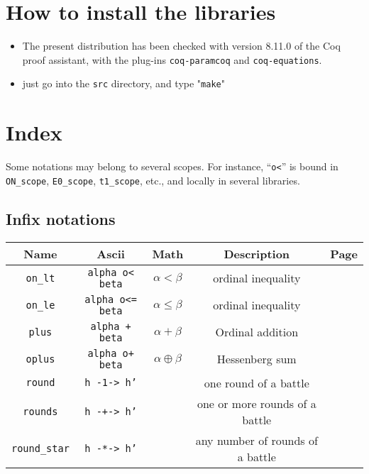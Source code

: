 \documentclass[a4paper]{book}
\begin{document}
\section{How to install the libraries}
\label{sec:orgheadline4}
\begin{itemize}
\item The present distribution has been checked with version 8.11.0 of the Coq proof assistant, with the plug-ins \texttt{coq-paramcoq} and \texttt{coq-equations}.

\item just go into the \texttt{src} directory, and type "\texttt{make}"
\end{itemize}


\section{Index}
Some notations may belong to several scopes. For instance, ``\texttt{o<}'' is
bound in \texttt{ON\_scope}, \texttt{E0\_scope}, \texttt{t1\_scope}, etc., and locally in several libraries.


\subsection{Infix notations}



\vspace{4pt}

\begin{tabular}{|c|c|c|c|l|}
\hline
Name & Ascii&Math& Description& Page \\\hline
 \texttt{on\_lt} & \texttt{alpha o< beta}&$\alpha<\beta$& ordinal inequality & \pageref{sect:on-lt-notation}\\
 \texttt{on\_le} & \texttt{alpha o<= beta}&$\alpha\leq\beta$& ordinal inequality & \pageref{sect:on-lt-notation}\\
\texttt{plus} & \texttt{alpha + beta} & $\alpha + \beta$ & Ordinal addition & \pageref{sect:infix-oplus} \\
\texttt{oplus} & \texttt{alpha o+ beta} & $\alpha \oplus \beta$ & Hessenberg sum & \pageref{sect:infix-oplus} \\
\texttt{round} & \texttt{h -1-> h'} & & one round of a battle & \pageref{sect:infix-round} \\
\texttt{rounds} & \texttt{h -+-> h'} & & one or more  rounds of a battle & \pageref{sect:infix-rounds} \\
\texttt{round\_star} & \texttt{h -*-> h'} & & any number of rounds of a battle & \pageref{sect:infix-rounds} \\

\hline
\end{tabular}
\end{document}
